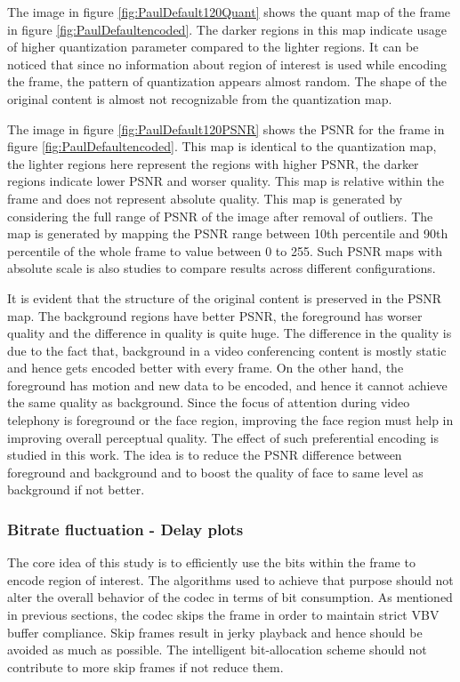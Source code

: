 \documentclass[11pt]{article} %
\begin{document}
The image in figure \ref{fig:PaulDefault120Quant} shows the quant map of the frame in figure \ref{fig:PaulDefaultencoded}. The darker regions in this map indicate usage of higher quantization parameter compared to the lighter regions. It can be noticed that since no information about region of interest is used while encoding the frame, the pattern of quantization appears almost random. The shape of the original content is almost not recognizable from the quantization map.

The image in figure \ref{fig:PaulDefault120PSNR} shows the PSNR for the frame in figure \ref{fig:PaulDefaultencoded}. This map is identical to the quantization map, the lighter regions here represent the regions with higher PSNR, the darker regions indicate lower PSNR and worser quality. This map is relative within the frame and does not represent  absolute quality. This map is generated by considering the full range of PSNR of the image after removal of outliers. The map is generated by mapping the PSNR range between 10th percentile and 90th percentile of the whole frame to value between 0 to 255. Such PSNR maps with absolute scale is also studies to compare results across different configurations. 

It is evident that the structure of the original content is preserved in the PSNR map. The background regions have better PSNR, the foreground has worser quality and the difference in quality is quite huge. The difference in the quality is due to the fact that, background in a video conferencing content is mostly static and hence gets encoded better with every frame. On the other hand, the foreground has motion and new data to be encoded, and hence it cannot achieve the same quality as background. Since the focus of attention during video telephony is foreground or the face region, improving the face region must help in improving overall perceptual quality. The effect of such preferential encoding is studied in this work. The idea is to reduce the PSNR difference between foreground and background and to boost the quality of face to same level as background if not better.
\subsubsection{Bitrate fluctuation - Delay plots}
The core idea of this study is to efficiently use the bits within the frame to encode region of interest. The algorithms used to achieve that purpose should not alter the overall behavior of the codec in terms of bit consumption. As mentioned in previous sections, the codec skips the frame in order to maintain strict VBV buffer compliance. Skip frames result in jerky playback and hence should be avoided as much as possible. The intelligent bit-allocation scheme should not contribute to more skip frames if not reduce them.
\end{document}
